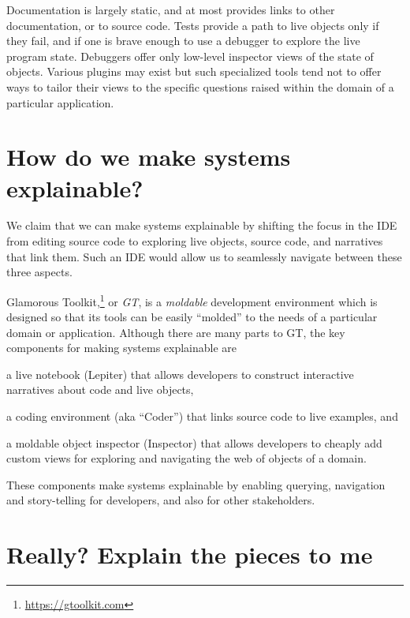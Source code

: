 \documentclass[conference]{IEEEtran}
\begin{document}
Documentation is largely static, and at most provides links to other documentation, or to source code.
Tests provide a path to live objects only if they fail, and if one is brave enough to use a debugger to explore the live program state.
Debuggers offer only low-level inspector views of the state of objects.
Various plugins may exist but such specialized tools tend not to offer ways to tailor their views to the specific questions raised within the domain of a particular application.

\section*{How do we make systems explainable?}

We claim that we can make systems explainable by shifting the focus in the IDE from editing source code to exploring live objects, source code, and narratives that link them.
Such an IDE would allow us to seamlessly navigate between these three aspects.

Glamorous Toolkit,\footnote{\url{https://gtoolkit.com}} or \emph{GT}, is a \emph{moldable} development environment which is designed so that its tools can be easily ``molded'' to the needs of a particular domain or application.
Although there are many parts to GT, the key components for making systems explainable are
\begin{inparaenum}[(i)]
\item a live notebook (Lepiter) that allows developers to construct interactive narratives about code and live objects,
\item a coding environment (aka ``Coder'') that links source code to live examples, and
\item a moldable object inspector (Inspector) that allows developers to cheaply add custom views for exploring and navigating the web of objects of a domain.
\end{inparaenum}

These components make systems explainable by enabling querying, navigation and story-telling for developers, and also for other stakeholders.

\section*{Really? Explain the pieces to me}

\end{document}
